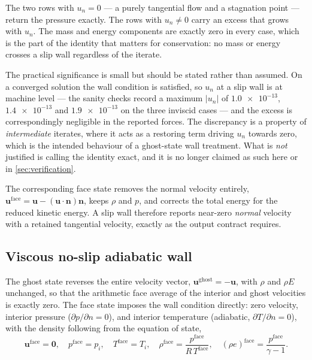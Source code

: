 \noindent The two rows with $u_n=0$ --- a purely tangential flow and a stagnation point
--- return the pressure exactly. The rows with $u_n\ne0$ carry an excess that grows with
$u_n$. The mass and energy components are exactly zero in every case, which is the part
of the identity that matters for conservation: no mass or energy crosses a slip wall
regardless of the iterate.

The practical significance is small but should be stated rather than assumed. On a
converged solution the wall condition is satisfied, so $u_n$ at a slip wall is at
machine level --- the sanity checks record a maximum $|u_n|$ of
$\num{1.0e-13}$, $\num{1.4e-13}$ and $\num{1.9e-13}$ on the three inviscid cases --- and
the excess is correspondingly negligible in the reported forces. The discrepancy is a
property of \emph{intermediate} iterates, where it acts as a restoring term driving
$u_n$ towards zero, which is the intended behaviour of a ghost-state wall treatment.
What is \emph{not} justified is calling the identity exact, and it is no longer claimed
as such here or in \cref{sec:verification}.

The corresponding face state removes the normal velocity entirely,
$\mathbf{u}^{\mathrm{face}}=\mathbf{u}-(\mathbf{u}\!\cdot\!\mathbf{n})\mathbf{n}$,
keeps $\rho$ and $p$, and corrects the total energy for the reduced kinetic
energy. A slip wall therefore reports near-zero \emph{normal} velocity with a
retained tangential velocity, exactly as the output contract requires.

\subsection{Viscous no-slip adiabatic wall}

The ghost state reverses the entire velocity vector,
$\mathbf{u}^{\mathrm{ghost}}=-\mathbf{u}$, with $\rho$ and $\rho E$ unchanged, so
that the arithmetic face average of the interior and ghost velocities is exactly
zero. The face state imposes the wall condition directly: zero velocity,
interior pressure ($\partial p/\partial n=0$), and interior temperature
(adiabatic, $\partial T/\partial n=0$), with the density following from the
equation of state,
\begin{equation}
  \mathbf{u}^{\mathrm{face}}=\mathbf{0},\quad
  p^{\mathrm{face}}=p_i,\quad
  T^{\mathrm{face}}=T_i,\quad
  \rho^{\mathrm{face}}=\frac{p^{\mathrm{face}}}{R\,T^{\mathrm{face}}},\quad
  (\rho e)^{\mathrm{face}}=\frac{p^{\mathrm{face}}}{\gamma-1}.
  \label{eq:noslipface}
\end{equation}

